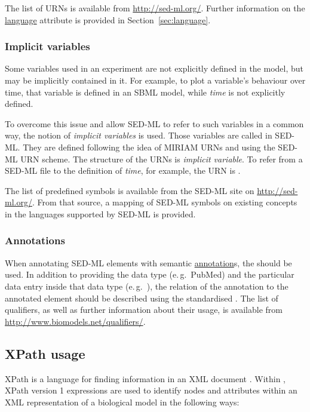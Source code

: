 The list of URNs is available from \url{http://sed-ml.org/}. 
Further information on the \hyperref[sec:language]{language} attribute is provided in Section~\ref{sec:language}.

\subsubsection{Implicit variables}
\label{sec:implicitVariableURI}

Some variables used in an experiment are not explicitly defined in the model, but may be implicitly contained in it. 
For example, to plot a variable's behaviour over time, that variable is defined in an SBML model, while \emph{time} is not explicitly defined. 

To overcome this issue and allow SED-ML to refer to such variables in a common way, the notion of \emph{implicit variables} is used.
Those variables are called  in SED-ML. They are defined following the idea of MIRIAM URNs and using the SED-ML URN scheme. The structure of the URNs is \emph{implicit variable}.
To refer from a SED-ML file to the definition of \emph{time}, for example, the URN is .

The list of predefined symbols is available from the SED-ML site on \url{http://sed-ml.org/}.
From that source, a mapping of SED-ML symbols on existing concepts in the languages supported by SED-ML is provided.

\subsubsection{Annotations}
\label{sec:annotations}
When annotating SED-ML elements with semantic \hyperref[class:annotation]{annotation}s, the  should be used. In addition to providing the data type (e.\,g.\ PubMed) and the particular data entry inside that data type (e.\,g.\ ), the relation of the annotation to the annotated element should be described using the standardised . The list of qualifiers, as well as further information about their usage, is available from \url{http://www.biomodels.net/qualifiers/}.


\subsection{XPath usage}  
\label{sec:xpath}
XPath is a language for finding information in an XML document \citep{xpath:1999}. Within \currentLV, XPath version 1 expressions are  used to identify nodes and attributes within an XML representation of a biological model in the following ways:

